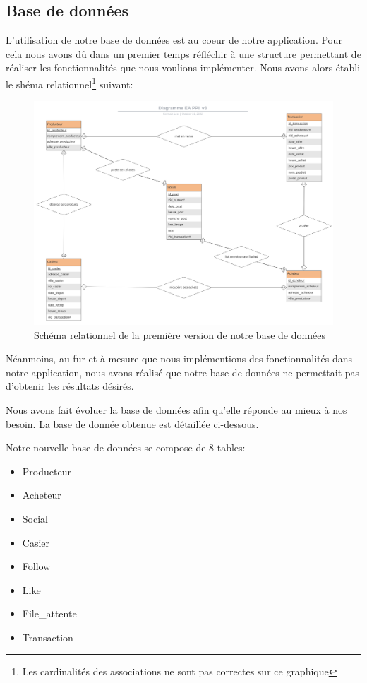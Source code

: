 \documentclass[11pt]{article}
\begin{document}
\subsection{Base de données}

L'utilisation de notre base de données est au coeur de notre application. Pour cela nous avons dû dans un premier temps réfléchir à une structure permettant de réaliser les fonctionnalités que nous voulions implémenter. Nous avons alors établi le shéma relationnel\footnote{Les cardinalités des  associations ne sont pas correctes sur ce graphique} suivant:

\begin{figure}[h]
\begin{center}
\includegraphics[scale=0.46]{DiagrammeBD.png}
\caption{Schéma relationnel de la première version de notre base de données}
\end{center}
\end{figure}

Néanmoins, au fur et à mesure que nous implémentions des fonctionnalités dans notre application, nous avons réalisé que notre base de données ne permettait pas d'obtenir les résultats désirés.

Nous avons fait évoluer la base de données afin qu'elle réponde au mieux à nos besoin. La base de donnée obtenue est détaillée ci-dessous.
\vspace{0.4cm}

Notre nouvelle base de données se compose de 8 tables:
\begin{itemize}
    \item Producteur
    \item Acheteur
    \item Social
    \item Casier
    \item Follow
    \item Like
    \item File\_attente
    \item Transaction
\end{itemize}
\vspace{0.4cm}
\end{document}
